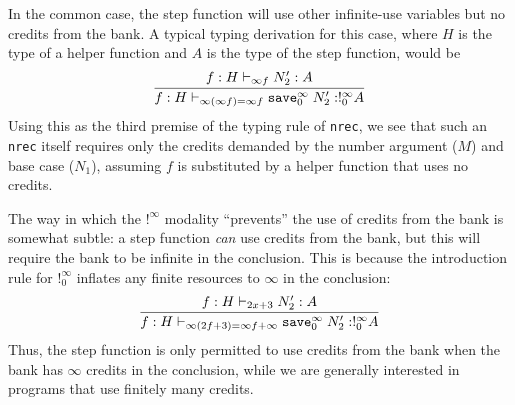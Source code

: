 In the common case, the step function will use other
infinite-use variables but no credits from the bank.  A typical 
typing derivation for this case, where $H$ is the type of a helper
function and $A$ is the type of the step function, would be
\[
\infer{f : H \vdash_{\infty (\infty f) = \infty f} \save{\infty}{0}{N_2'} : !^\infty_0 A}
      {f : H \vdash_{\infty f} N_2' : A}
\]
Using this as the third premise of the typing rule of \texttt{nrec}, we
see that such an \texttt{nrec} itself requires only the credits demanded
by the number argument ($M$) and base case ($N_1$), assuming $f$ is
substituted by a helper function that uses no credits.

The way in which the $!^\infty$ modality ``prevents'' the use of credits
from the bank is somewhat subtle: a step function \emph{can} use credits
from the bank, but this will require the bank to be infinite in the
conclusion.  This is because the introduction rule for $!^\infty_0$ 
inflates any finite resources to $\infty$ in the conclusion:
\[
\infer{f : H \vdash_{\infty(2f + 3) = \infty f + \infty} \save{\infty}{0}{N_2'} : !^\infty_0 A}
      {f : H \vdash_{2x + 3} N_2' : A}
\]
Thus, the step function is only permitted to use credits from the bank
when the bank has $\infty$ credits in the conclusion, while we are
generally interested in programs that use finitely many credits.  


